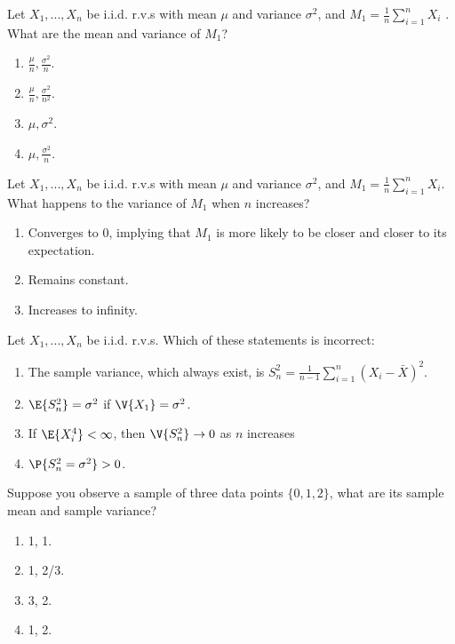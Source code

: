\documentclass[poll_tutorial_format]{subfiles}
\begin{document}
	\begin{exercise}
		Let $X_1, . . . ,X_n$ be i.i.d. r.v.s with mean $\mu$ and variance $\sigma^2$, and $M_1=\frac{1}{n}\sum_{i=1}^n X_i$ . What are the mean and variance of $M_1$? 
		\begin{enumerate}
			\item $\frac{\mu}{n}, \frac{\sigma^2}{n}$.
			\item $\frac{\mu}{n}, \frac{\sigma^2}{n^2}$.			
			\item ${\mu}{},  {\sigma^2}{}$.			
			\item ${\mu}{},  \frac{\sigma^2}{n}$.
		\end{enumerate}
	\end{exercise}
	

	
		\begin{exercise}
		Let $X_1, . . . ,X_n$ be i.i.d. r.v.s with mean $\mu$ and variance $\sigma^2$, and $M_1=\frac{1}{n}\sum_{i=1}^n X_i$. What happens to the variance of $M_1$ when $n$ increases? 
		\begin{enumerate}
			\item Converges to 0, implying that $M_1$ is more likely to be closer and closer to its expectation. 
			\item Remains constant.			
			\item Increases to infinity.			
		\end{enumerate}
	\end{exercise}
	
	
	
	\begin{exercise}
	Let $X_1, . . . ,X_n$ be i.i.d. r.v.s.
	Which of these statements is incorrect: %
		\begin{enumerate}
			\item The sample variance, which always exist, is $S_n^2=\frac{1}{n-1}\sum_{i=1}^n (X_i-\bar{X})^2$.
			\item $\E{S_n^2} =\sigma^2$ if $\V{X_1}=\sigma^2$.
			\item If $\E{X^4_i} <\infty$, then $\V{S_n^2} \rightarrow 0$ as $n$ increases 
			\item $\P{S_n^2 =\sigma^2} >0$. 
		\end{enumerate}
	\end{exercise}
	

	
\begin{exercise}
	Suppose you observe a sample of three data points $\{0,1,2\}$, what are its sample mean and sample variance? 
	\begin{enumerate}
		\item  1, 1.
		\item  1, 2/3.
		\item  3, 2. 
		\item  1, 2. 
	\end{enumerate}
\end{exercise}
\end{document}
